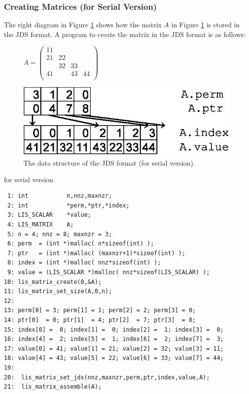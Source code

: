 \documentclass[a4paper]{article}
\begin{document}
\newpage
\subsubsection{Creating Matrices (for Serial Version)}
The right diagram in Figure \ref{fig:storage06} shows how the matrix $A$ in Figure \ref{fig:storage06} is stored in the JDS format. A program to create the matrix in the JDS format is as follows: 
\begin{figure}[h]
{\centering 
\begin{minipage}{0.3\textwidth}
\begin{flushright}
$ 
A = \left(
\begin{array}{cccc}
11 &    &    &    \\
21 & 22 &    &    \\
   & 32 & 33 &    \\
41 &    & 43 & 44 \\
\end{array}\right)
$
\end{flushright}
\end{minipage}
\begin{minipage}{0.6\textwidth}
\begin{flushleft}
\includegraphics{storage06.eps} 
\end{flushleft}
\end{minipage}
\caption{The data structure of the JDS format (for serial version).}\label{fig:storage06}}
\end{figure}
\begin{itembox}[l]{for serial version}
\small
\begin{verbatim}
 1: int           n,nnz,maxnzr;
 2: int           *perm,*ptr,*index;
 3: LIS_SCALAR    *value;
 4: LIS_MATRIX    A;
 5: n = 4; nnz = 8; maxnzr = 3;
 6: perm  = (int *)malloc( n*sizeof(int) );
 7: ptr   = (int *)malloc( (maxnzr+1)*sizeof(int) );
 8: index = (int *)malloc( nnz*sizeof(int) );
 9: value = (LIS_SCALAR *)malloc( nnz*sizeof(LIS_SCALAR) );
10: lis_matrix_create(0,&A);
11: lis_matrix_set_size(A,0,n);
12:
13: perm[0] = 3; perm[1] = 1; perm[2] = 2; perm[3] = 0;
14: ptr[0]  = 0; ptr[1]  = 4; ptr[2]  = 7; ptr[3]  = 8;
15: index[0] =  0; index[1] =  0; index[2] =  1; index[3] =  0;
16: index[4] =  2; index[5] =  1; index[6] =  2; index[7] =  3;
17: value[0] = 41; value[1] = 21; value[2] = 32; value[3] = 11;
18: value[4] = 43; value[5] = 22; value[6] = 33; value[7] = 44;
19:
20:  lis_matrix_set_jds(nnz,maxnzr,perm,ptr,index,value,A);
21:  lis_matrix_assemble(A);
\end{verbatim}
\end{itembox}
\newpage
\end{document}
